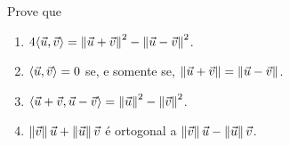 \documentclass[12pt]{exam}
\begin{document}
%
%
%
%
%

\questao{} Prove que
\begin{enumerate}[label=({\alph*})]
    \item $4\langle \vec{u}, \vec{v} \rangle = \left\Vert{\vec{u} + \vec{v}}\right\Vert^2 - \left\Vert{\vec{u} - \vec{v}}\right\Vert^2$.
    \item $\langle \vec{u}, \vec{v} \rangle = 0$ se, e somente se, $\left\Vert{\vec{u} + \vec{v}}\right\Vert = \left\Vert{\vec{u} - \vec{v}}\right\Vert$.
    \item $\langle\vec{u} + \vec{v}, \vec{u} - \vec{v}\rangle = \left\Vert{\vec{u}}\right\Vert^2 - \left\Vert{\vec{v}}\right\Vert^2$.
    \item $\left\Vert{\vec{v}}\right\Vert\vec{u} + \left\Vert{\vec{u}}\right\Vert\vec{v}$ é ortogonal a $\left\Vert{\vec{v}}\right\Vert\vec{u} - \left\Vert{\vec{u}}\right\Vert\vec{v}$.
\end{enumerate}
\end{document}
